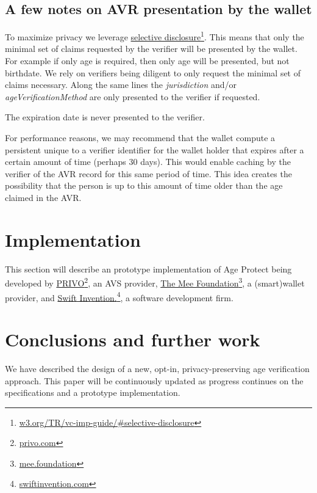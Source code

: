 \documentclass[11pt, oneside]{article}   	%
\newcommand{\hyperfootnote}[1][]{\def\ArgI{{#1}}\hyperfootnoteRelay}
\newcommand\hyperfootnoteRelay[2][]{\href{#1#2}{\ArgI}\footnote{\href{#1#2}{#2}}}
\begin{document}
\subsection{A few notes on AVR presentation by the wallet}

To maximize privacy we leverage \hyperfootnote[selective disclosure][https://]{w3.org/TR/vc-imp-guide/\#selective-disclosure}. This means that only the minimal set of claims requested by the verifier will be presented by the wallet. For example if only age is required, then only age will be presented, but not birthdate. We rely on verifiers being diligent to only request the minimal set of claims necessary. Along the same lines the \emph{jurisdiction} and/or \emph{ageVerificationMethod} are only presented to the verifier if requested. 

The expiration date is never presented to the verifier.

For performance reasons, we may recommend that the wallet compute a persistent unique to a verifier identifier for the wallet holder that expires after a certain amount of time (perhaps 30 days). This would enable caching by the verifier of the AVR record for this same period of time. This idea creates the possibility that the person is up to this amount of time older than the age claimed in the AVR. 

\section{Implementation}

This section will describe an prototype implementation of Age Protect being developed by \hyperfootnote[PRIVO][https://]{privo.com}, an AVS provider, \hyperfootnote[The Mee Foundation][https://]{mee.foundation}, a (smart)wallet provider, and \hyperfootnote[Swift Invention.][https://]{swiftinvention.com}, a software development firm.

\section{Conclusions and further work}
We have described the design of a new, opt-in, privacy-preserving age verification approach. This paper will be continuously updated as progress continues on the specifications and a prototype implementation.



\end{document}
